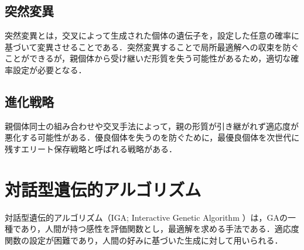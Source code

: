\subsection{突然変異}
突然変異とは，交叉によって生成された個体の遺伝子を，設定した任意の確率に基づいて変異させることである．突然変異することで局所最適解への収束を防ぐことができるが，親個体から受け継いだ形質を失う可能性があるため，適切な確率設定が必要となる．
\subsection{進化戦略}
親個体同士の組み合わせや交叉手法によって，親の形質が引き継がれず適応度が悪化する可能性がある．優良個体を失うのを防ぐために，最優良個体を次世代に残すエリート保存戦略と呼ばれる戦略がある．

\section{対話型遺伝的アルゴリズム}
対話型遺伝的アルゴリズム（IGA; Interactive Genetic Algorithm ）は，GAの一種であり，人間が持つ感性を評価関数とし，最適解を求める手法である．適応度関数の設定が困難であり，人間の好みに基づいた生成に対して用いられる．